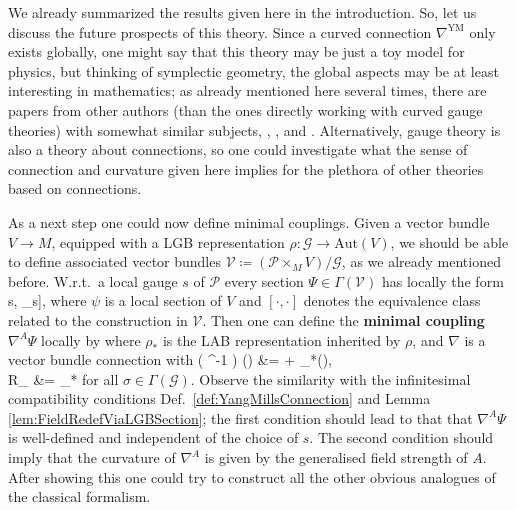 \documentclass[a4paper,oneside,11pt,bibliography=totoc]{scrartcl}
\def\bas#1\eas{\begin{align*}#1\end{align*}}
\theoremstyle{plain}
\theoremstyle{remark}
\theoremstyle{definition}
\begin{document}
We already summarized the results given here in the introduction. So, let us discuss the future prospects of this theory. Since a curved connection $\nabla^{\mathrm{YM}}$ only exists globally, one might say that this theory may be just a toy model for physics, but thinking of symplectic geometry, the global aspects may be at least interesting in mathematics; as already mentioned here several times, there are papers from other authors (than the ones directly working with curved gauge theories) with somewhat similar subjects, \cite{LAURENTGENGOUXStienonXuMultiplicativeForms}, \cite{OtherPreprintAboutConnection}, and \cite{FernandesMarcutMultiplicativeForms}. Alternatively, gauge theory is also a theory about connections, so one could investigate what the sense of connection and curvature given here implies for the plethora of other theories based on connections.

As a next step one could now define minimal couplings. Given a vector bundle $V \to M$, equipped with a LGB representation $\rho: \mathcal{G} \to \mathrm{Aut}(V)$, we should be able to define associated vector bundles $\mathcal{V} \coloneqq ( \mathcal{P} \times_M V ) \Big/ \mathcal{G}$, as we already mentioned before. W.r.t.\ a local gauge $s$ of $\mathcal{P}$ every section $\Psi \in \Gamma(\mathcal{V})$ has locally the form
\bas
[s, \psi_s],
\eas
where $\psi$ is a local section of $V$ and $[ \cdot, \cdot ]$ denotes the equivalence class related to the construction in $\mathcal{V}$. Then one can define the \textbf{minimal coupling $\nabla^A \Psi$} locally by
\bas
\mleft[  s,
	\nabla \psi_s + \rho_*(A_s)(\psi_s)
\mright]
\eas 
where $\rho_*$ is the LAB representation inherited by $\rho$, and $\nabla$ is a vector bundle connection with
\bas
\rho\mleft( \sigma^{-1} \mright) \circ \nabla \circ \rho(\sigma)
&=
\nabla
    + \rho_*(\Delta \sigma),
\\
R_\nabla
&=
\rho_* \circ \zeta
\eas
for all $\sigma \in \Gamma(\mathcal{G})$.
Observe the similarity with the infinitesimal compatibility conditions Def.\ \ref{def:YangMillsConnection} and Lemma \ref{lem:FieldRedefViaLGBSection}; the first condition should lead to that that $\nabla^A \Psi$ is well-defined and independent of the choice of $s$. The second condition should imply that the curvature of $\nabla^A$ is given by the generalised field strength of $A$. After showing this one could try to construct all the other obvious analogues of the classical formalism.
\end{document}
